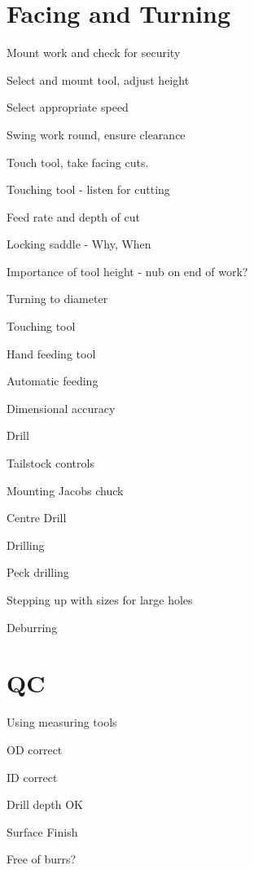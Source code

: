 \documentclass[11pt,a5paper,twoside,openany]{book}
\newenvironment{checklist}{
  \begin{list}{}{}
  
}{%
  \end{list}
}
\begin{document}
\chapter{Facing and Turning}
	\begin{checklist}
	\item Mount work and check for security
	\item Select and mount tool, adjust height
	\item Select appropriate speed
	\item Swing work round, ensure clearance
	\item Touch tool, take facing cuts.
		\begin{checklist}
		\item Touching tool - listen for cutting
		\item Feed rate and depth of cut
		\item Locking saddle - Why, When
		\item Importance of tool height - nub on end of work?
		\end{checklist}
	\item Turning to diameter
		\begin{checklist}
		\item Touching tool
		\item Hand feeding tool
		\item Automatic feeding
		\item Dimensional accuracy
		\end{checklist}
	\item Drill
		\begin{checklist}
		\item Tailstock controls
		\item Mounting Jacobs chuck
		\item Centre Drill
		\item Drilling
			\begin{checklist}
			\item Peck drilling
			\item Stepping up with sizes for large holes
			\end{checklist}
		\item Deburring
		\end{checklist}
	\end{checklist}
\chapter {QC}
	\begin{checklist}
	\item Using measuring tools
	\item OD correct
	\item ID correct
	\item Drill depth OK
	\item Surface Finish
	\item Free of burrs?
	\end{checklist}
\end{document}
